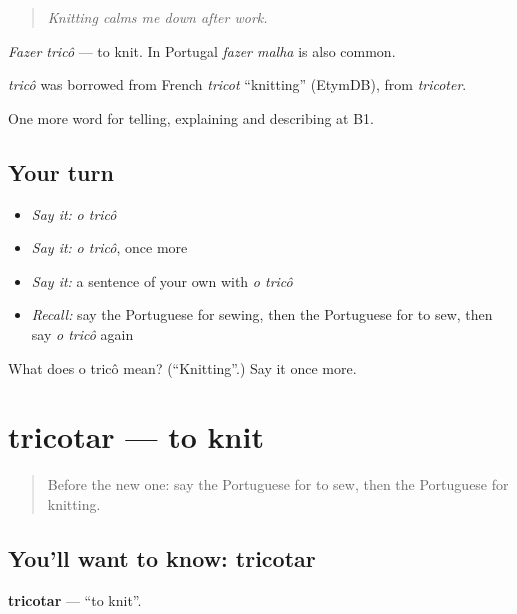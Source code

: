 \begin{quote}
\emph{Knitting calms me down after work.}
\end{quote}

\emph{Fazer tricô} — to knit. In Portugal \emph{fazer malha} is also common.

\begin{cousinweb}
\emph{tricô} was borrowed from French \emph{tricot} \textquotedblleft{}knitting\textquotedblright{} (EtymDB), from \emph{tricoter}.
\end{cousinweb}

\begin{grammarlens}[title={What you've built}]
One more word for telling, explaining and describing at B1.
\end{grammarlens}

\subsection*{Your turn}
\begin{itemize}
\raggedright
  \item \emph{Say it:} \emph{o tricô}
  \item \emph{Say it:} \emph{o tricô}, once more
  \item \emph{Say it:} a sentence of your own with \emph{o tricô}
  \item \emph{Recall:} say the Portuguese for sewing, then the Portuguese for to sew, then say \emph{o tricô} again
\end{itemize}

\begin{tcolorbox}[breakable,colback=teal!4,colframe=teal!35!black,title={Before you move on}]
What does o tricô mean? (\textquotedblleft{}Knitting\textquotedblright{}.) Say it once more.
\end{tcolorbox}
\section[tricotar]{tricotar — to knit}

\label{lesson:PT-C500-tricotar}



\begin{quote}
Before the new one: say the Portuguese for to sew, then the Portuguese for knitting.
\end{quote}

\subsection*{You'll want to know: tricotar}
\textbf{tricotar} — \textquotedblleft{}to knit\textquotedblright{}.

